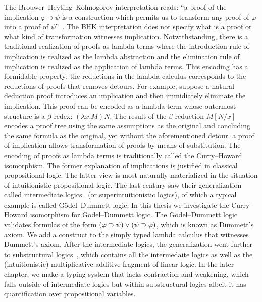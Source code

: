 The
Brouwer--Heyting--Kolmogorov interpretation reads: ``a proof of the
implication $\varphi\supset\psi$ is a construction which permits us to
 transform any proof of $\varphi$ into a proof of $\psi$''~.
The BHK
interpretation does not specify what is a proof or what kind of
transformation witnesses implication.
Notwithstanding, there is a
traditional realization of proofs as lambda terms where the
introduction rule of implication is realized as the lambda abstraction
and the elimination rule of implication is realized as the application
of lambda terms.
This encoding has a formidable property:
the reductions in the lambda calculus corresponds to the reductions of
proofs that
removes detours.
For example, suppose a natural deduction proof introduces an implication and then
immidiately eliminate the
implication.  This proof can be encoded as a lambda term whose outermost
structure is a $\beta$-redex: $(\lambda x. M)N$.
 The result of the $\beta$-reduction $M[N/x]$ encodes a proof tree using
 the same assumptions as the original and concluding the same formula as
 the original, yet without the aforementioned detour.
 a proof of implication allows transformation of proofs
by means of
substitution.  The encoding of proofs as lambda terms is traditionally
called the Curry--Howard isomorphism.
The former explanation of implications is justified in classical propositional logic.
The latter view is most naturally materialized in the situation of
intuitionistic propositional logic.  The last century saw their
generalization called intermediate logics~\citep{umezawa} (or superintuitionistic
logics), of which a typical example is called G\"odel--Dummett logic.
In this thesis we investigate the Curry--Howard isomorphism for
G\"odel--Dummett logic.  The G\"odel--Dummett logic validates formulas
of the form $(\varphi\supset\psi)\lor(\psi\supset\varphi)$, which is known as
Dummett's axiom.  We add a construct to the simply typed lambda calculus
that witnesses Dummett's axiom.
After the intermediate logics, the generalization went further to
substructural
logics~\citep{residuated}, which contains all the intermedaite logics as
well as the
(intuitionistic) multiplicative
additive fragment of linear logic.
In the later chapter, we make a typing system that lacks contraction and
weakening, which falls outside of intermediate logics but within
substructural logics albeit it has quantification over propositional variables.


